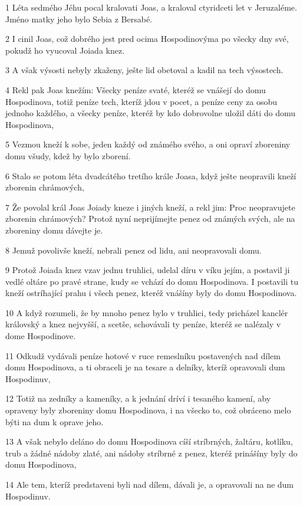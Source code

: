 \par 1 Léta sedmého Jéhu pocal kralovati Joas, a kraloval ctyridceti let v Jeruzaléme. Jméno matky jeho bylo Sebia z Bersabé.
\par 2 I cinil Joas, což dobrého jest pred ocima Hospodinovýma po všecky dny své, pokudž ho vyucoval Joiada knez.
\par 3 A však výsosti nebyly zkaženy, ješte lid obetoval a kadil na tech výsostech.
\par 4 Rekl pak Joas knežím: Všecky peníze svaté, kteréž se vnášejí do domu Hospodinova, totiž peníze tech, kteríž jdou v pocet, a peníze ceny za osobu jednoho každého, a všecky peníze, kteréž by kdo dobrovolne uložil dáti do domu Hospodinova,
\par 5 Vezmou kneží k sobe, jeden každý od známého svého, a oni opraví zboreniny domu všudy, kdež by bylo zborení.
\par 6 Stalo se potom léta dvadcátého tretího krále Joasa, když ješte neopravili kneží zborenin chrámových,
\par 7 Že povolal král Joas Joiady kneze i jiných kneží, a rekl jim: Proc neopravujete zborenin chrámových? Protož nyní neprijímejte penez od známých svých, ale na zboreniny domu dávejte je.
\par 8 Jemuž povolivše kneží, nebrali penez od lidu, ani neopravovali domu.
\par 9 Protož Joiada knez vzav jednu truhlici, udelal díru v víku jejím, a postavil ji vedlé oltáre po pravé strane, kudy se vchází do domu Hospodinova. I postavili tu kneží ostríhající prahu i všech penez, kteréž vnášíny byly do domu Hospodinova.
\par 10 A když rozumeli, že by mnoho penez bylo v truhlici, tedy pricházel kanclér královský a knez nejvyšší, a scetše, schovávali ty peníze, kteréž se nalézaly v dome Hospodinove.
\par 11 Odkudž vydávali peníze hotové v ruce remeslníku postavených nad dílem domu Hospodinova, a ti obraceli je na tesare a delníky, kteríž opravovali dum Hospodinuv,
\par 12 Totiž na zedníky a kameníky, a k jednání dríví i tesaného kamení, aby opraveny byly zboreniny domu Hospodinova, i na všecko to, což obráceno melo býti na dum k oprave jeho.
\par 13 A však nebylo deláno do domu Hospodinova cíší stríbrných, žaltáru, kotlíku, trub a žádné nádoby zlaté, ani nádoby stríbrné z penez, kteréž prinášíny byly do domu Hospodinova,
\par 14 Ale tem, kteríž predstaveni byli nad dílem, dávali je, a opravovali na ne dum Hospodinuv.

